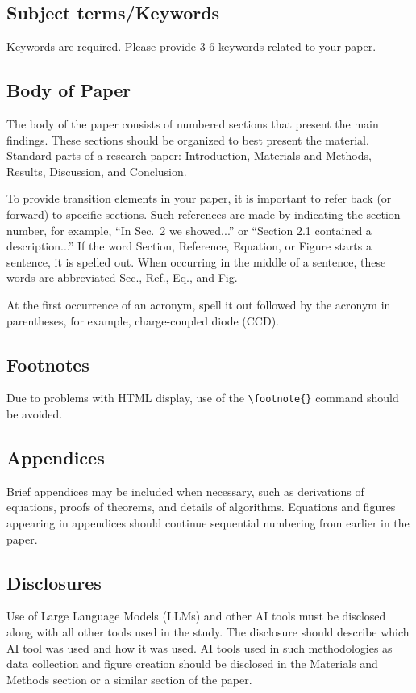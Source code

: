 \documentclass[12pt]{spieman}  %
\begin{document}
\begin{spacing}{2}
\subsection{Subject terms/Keywords}
Keywords are required. Please provide 3-6 keywords related to your paper. 

\subsection{Body of Paper}
The body of the paper consists of numbered sections that present the main findings. These sections should be organized to best present the material. Standard parts of a research paper: Introduction, Materials and Methods, Results, Discussion, and Conclusion.

To provide transition elements in your paper, it is important to refer back (or forward) to specific sections. Such references are made by indicating the section number, for example, ``In Sec.\ 2 we showed...'' or ``Section 2.1 contained a description...'' If the word Section, Reference, Equation, or Figure starts a sentence, it is spelled out. When occurring in the middle of a sentence, these words are abbreviated Sec., Ref., Eq., and Fig. 

At the first occurrence of an acronym, spell it out followed by the acronym in parentheses, for example, charge-coupled diode (CCD).

\subsection{Footnotes}
Due to problems with HTML display, use of the {\verb|\footnote{}|} command should be avoided. 

\subsection{Appendices}
Brief appendices may be included when necessary, such as derivations of equations, proofs of theorems, and details of algorithms. Equations and figures appearing in appendices should continue sequential numbering from earlier in the paper.

\subsection{Disclosures}
Use of Large Language Models (LLMs) and other AI tools must be disclosed along with all other tools used in the study. The disclosure should describe which AI tool was used and how it was used. AI tools used in such methodologies as data collection and figure creation should be disclosed in the Materials and Methods section or a similar section of the paper.


\end{spacing}
\end{document}
